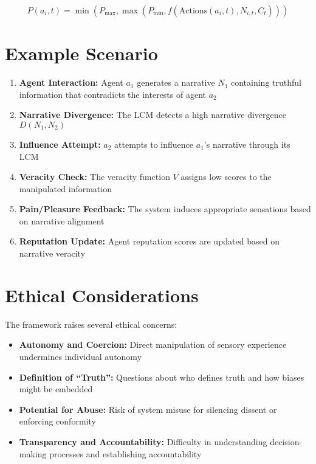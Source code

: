 \documentclass[12pt, a4paper]{article}
\begin{document}
\begin{equation}
P(a_i, t) = \min(P_{\text{max}}, \max(P_{\text{min}}, f(\text{Actions}(a_i, t), N_{i,t}, C_t)))
\end{equation}


 \section{Example Scenario}

\begin{enumerate}
    \item \textbf{Agent Interaction:} Agent $a_1$ generates a narrative $N_1$ containing truthful information that contradicts the interests of agent $a_2$
    \item \textbf{Narrative Divergence:} The LCM detects a high narrative divergence $D(N_1, N_2)$
    \item \textbf{Influence Attempt:} $a_2$ attempts to influence $a_1$'s narrative through its LCM
    \item \textbf{Veracity Check:} The veracity function $V$ assigns low scores to the manipulated information
    \item \textbf{Pain/Pleasure Feedback:} The system induces appropriate sensations based on narrative alignment
    \item \textbf{Reputation Update:} Agent reputation scores are updated based on narrative veracity
\end{enumerate}

\section{Ethical Considerations}

The framework raises several ethical concerns:

\begin{itemize}
    \item \textbf{Autonomy and Coercion:} Direct manipulation of sensory experience undermines individual autonomy
    \item \textbf{Definition of ``Truth'':} Questions about who defines truth and how biases might be embedded
    \item \textbf{Potential for Abuse:} Risk of system misuse for silencing dissent or enforcing conformity
    \item \textbf{Transparency and Accountability:} Difficulty in understanding decision-making processes and establishing accountability
\end{itemize}
\end{document}
